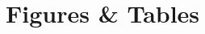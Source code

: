 \documentclass[11pt]{article}
\begin{document}

\clearpage
\section*{Figures \& Tables}
\end{document}
